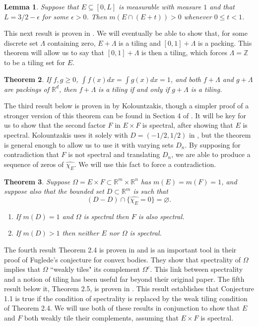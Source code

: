 \documentclass{amsart}
\newtheorem{theorem}{Theorem}[section]
\newtheorem{lemma}[theorem]{Lemma}
\newcommand{\Z}{\mathbb{Z}}
\begin{document}
\begin{lemma}
    Suppose that $E\subseteq[0,L]$ is measurable with measure $1$ and that $L=3/2-\epsilon$ for some $\epsilon>0$. Then $m(E\cap(E+t))>0$ whenever $0\leq t<1$.
\end{lemma}


This next result is proven in  \cite{K99}. We will eventually be able to show that, for some discrete set $\Lambda$ containing zero, $E + \Lambda$ is a tiling and $[0,1] + \Lambda$ is a packing. This theorem will allow us to say that $[0,1] + \Lambda$ is then a tiling, which forces $\Lambda = \Z$ to be a tiling set for $E$. 

\begin{theorem}
    If $f,g\ge 0$, $\int f(x)dx=\int g(x)dx=1$, and both $f+\Lambda$ and $g+\Lambda$ are packings of $\mathbb{R}^d$, then $f+\Lambda$ is a tiling if and only if $g+\Lambda$ is a tiling.
\end{theorem}

The third result below is proven in \cite{K16} by Kolountzakis, though a simpler proof of a stronger version of this theorem can be found in Section 4 of \cite{GL20}. It will be key for us to show that the second factor $F$ in $E \times F$ is spectral, after showing that $E$ is spectral. Kolountzakis uses it solely with $D = (-1/2,1/2)$ in \cite{K16}, but the theorem is general enough to allow us to use it with varying sets $D_n$. By supposing for contradiction that $F$ is not spectral and translating $D_n$, we are able to produce a sequence of zeros of $\hat{\chi_E}$. We will use this fact to force a contradiction. 

\begin{theorem}
    Suppose $\Omega=E\times F\subset\mathbb{R}^m\times\mathbb{R}^n$ has $m(E)=m(F)=1$, and suppose also that the bounded set $D\subset \mathbb{R}^m$ is such that
    $$(D-D)\cap\{\hat{\chi_E}=0\}=\varnothing.$$

    \begin{enumerate}
        \item If $m(D)=1$ and $\Omega$ is spectral then $F$ is also spectral.
        \item If $m(D)>1$ then neither $E$ nor $\Omega$ is spectral.
    \end{enumerate}

    
\end{theorem}

The fourth result Theorem 2.4 is proven in \cite{LM22} and is an important tool in their proof of Fuglede's conjecture for convex bodies. They show that spectrality of $\Omega$ implies that $\Omega$ ``weakly tiles" its complement $\Omega^c$. This link between spectrality and a notion of tiling has been useful far beyond their original paper. The fifth result below it, Theorem 2.5, is proven in \cite{KLM}. This result establishes that Conjecture 1.1 is true if the condition of spectrality is replaced by the weak tiling condition of Theorem 2.4. We will use both of these results in conjunction to show that $E$ and $F$ both weakly tile their complements, assuming that $E \times F$ is spectral. 
\end{document}

